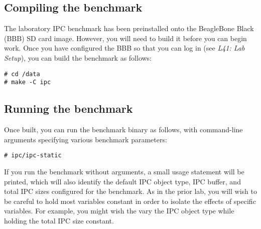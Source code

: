 \documentclass[a4paper,10pt]{article}
\begin{document}
\subsection*{Compiling the benchmark}





The laboratory IPC benchmark has been preinstalled onto the BeagleBone Black
(BBB) SD card image.  However, you will need to build it before you can begin
work. Once you have configured the BBB so that you can log in (see
\textit{L41: Lab Setup}), you can build the benchmark as follows:

\begin{verbatim}
# cd /data
# make -C ipc
\end{verbatim}

\subsection*{Running the benchmark}

Once built, you can run the benchmark binary as follows, with command-line
arguments specifying various benchmark parameters:

\begin{verbatim}
# ipc/ipc-static
\end{verbatim}

%

If you run the benchmark without arguments, a small usage statement will be
printed, which will also identify the default IPC object type, IPC buffer, and
total IPC sizes configured for the benchmark.
As in the prior lab, you will wish to be careful to hold most variables
constant in order to isolate the effects of specific variables.
For example, you might wish the vary the IPC object type while holding the
total IPC size constant.
\end{document}
